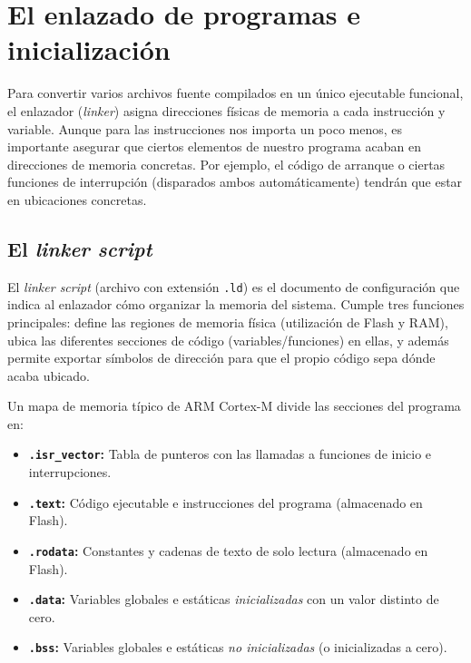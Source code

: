 \documentclass[../main.tex]{subfiles}
\begin{document}
\section{El enlazado de programas e inicialización}

    Para convertir varios archivos fuente compilados en un único ejecutable funcional, el enlazador (\emph{linker}) asigna direcciones físicas de memoria a cada instrucción y variable. Aunque para las instrucciones nos importa un poco menos, es importante asegurar que ciertos elementos de nuestro programa acaban en direcciones de memoria concretas. Por ejemplo, el código de arranque o ciertas funciones de interrupción (disparados ambos automáticamente) tendrán que estar en ubicaciones concretas. 

    \subsection{El \emph{linker script}}

        El \emph{linker script} (archivo con extensión \texttt{.ld}) es el documento de configuración que indica al enlazador cómo organizar la memoria del sistema. Cumple tres funciones principales: define las regiones de memoria física (utilización de Flash y RAM), ubica las diferentes secciones de código (variables/funciones) en ellas, y además permite exportar símbolos de dirección para que el propio código sepa dónde acaba ubicado.

        Un mapa de memoria típico de ARM Cortex-M divide las secciones del programa en:

        \begin{itemize}
            \item \textbf{\texttt{.isr\_vector}:} Tabla de punteros con las llamadas a funciones de inicio e interrupciones.
            \item \textbf{\texttt{.text}:} Código ejecutable e instrucciones del programa (almacenado en Flash).
            \item \textbf{\texttt{.rodata}:} Constantes y cadenas de texto de solo lectura (almacenado en Flash).
            \item \textbf{\texttt{.data}:} Variables globales e estáticas \emph{inicializadas} con un valor distinto de cero.
            \item \textbf{\texttt{.bss}:} Variables globales e estáticas \emph{no inicializadas} (o inicializadas a cero).
        \end{itemize}
\end{document}
